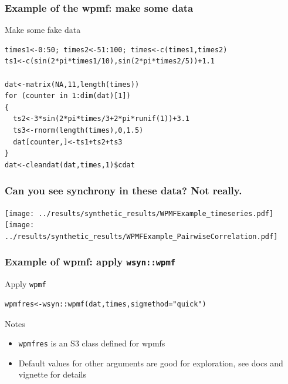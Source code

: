 \documentclass{beamer}
\begin{document}
\begin{frame}[fragile]
\frametitle{Example of the wpmf: make some data}
\begin{exampleblock}{Make some fake data}
\begin{verbatim}
times1<-0:50; times2<-51:100; times<-c(times1,times2)
ts1<-c(sin(2*pi*times1/10),sin(2*pi*times2/5))+1.1 

dat<-matrix(NA,11,length(times))
for (counter in 1:dim(dat)[1])
{
  ts2<-3*sin(2*pi*times/3+2*pi*runif(1))+3.1
  ts3<-rnorm(length(times),0,1.5)
  dat[counter,]<-ts1+ts2+ts3    
}
dat<-cleandat(dat,times,1)$cdat
\end{verbatim}
\end{exampleblock}
\end{frame}

\begin{frame}
\frametitle{Can you see synchrony in these data? Not really.}
\texttt{[image: ../results/synthetic\_results/WPMFExample\_timeseries.pdf]}
\texttt{[image: ../results/synthetic\_results/WPMFExample\_PairwiseCorrelation.pdf]}
\end{frame}

\begin{frame}[fragile]
\frametitle{Example of wpmf: apply \texttt{wsyn::wpmf}}
\begin{exampleblock}{Apply \texttt{wpmf}}
\begin{verbatim}
wpmfres<-wsyn::wpmf(dat,times,sigmethod="quick")
\end{verbatim}
\end{exampleblock}
\begin{block}{Notes}
\begin{itemize}
\item \texttt{wpmfres} is an S3 class defined for wpmfs 
\item Default values for other arguments are good for exploration, see docs and vignette for details
\end{itemize}
\end{block}
\end{frame}
\end{document}
